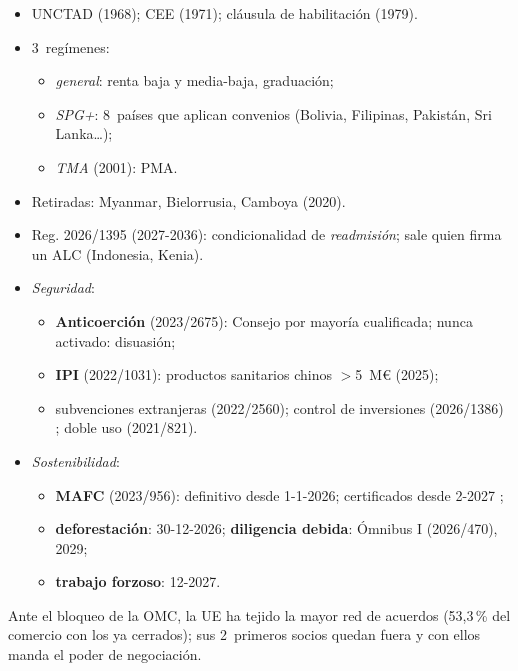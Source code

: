 \documentclass{article}
\begin{document}
\begin{columnas}
\begin{itemize}
\item UNCTAD (1968); CEE (1971); cláusula de habilitación (1979).
\item 3~regímenes:
  \begin{itemize}
  \item \emph{general}: renta baja y media-baja, graduación;
  \item \emph{SPG+}: 8~países que aplican convenios (Bolivia, Filipinas, Pakistán, Sri Lanka…);
  \item \emph{TMA} (2001): PMA.
  \end{itemize}
\item Retiradas: Myanmar, Bielorrusia, Camboya (2020).
\item Reg. 2026/1395 (2027-2036): condicionalidad de \emph{readmisión}; sale quien firma un ALC (Indonesia, Kenia).
\end{itemize}

\begin{itemize}
\item \emph{Seguridad}:
  \begin{itemize}
  \item \textbf{Anticoerción} (2023/2675): Consejo por mayoría cualificada; nunca activado: disuasión;
  \item \textbf{IPI} (2022/1031): productos sanitarios chinos $>$5~M€ (2025);
  \item subvenciones extranjeras (2022/2560); control de inversiones (2026/1386) ; doble uso (2021/821).
  \end{itemize}
\item \emph{Sostenibilidad}:
  \begin{itemize}
  \item \textbf{MAFC} (2023/956): definitivo desde 1-1-2026; certificados desde 2-2027 ;
  \item \textbf{deforestación}: 30-12-2026; \textbf{diligencia debida}: Ómnibus I (2026/470), 2029;
  \item \textbf{trabajo forzoso}: 12-2027.
  \end{itemize}
\end{itemize}

\begin{ideaclave}
Ante el bloqueo de la OMC, la UE ha tejido la mayor red de acuerdos (53,3\,\% del comercio con los ya cerrados); sus 2~primeros socios quedan fuera y con ellos manda el poder de negociación.
\end{ideaclave}


\end{columnas}
\end{document}
